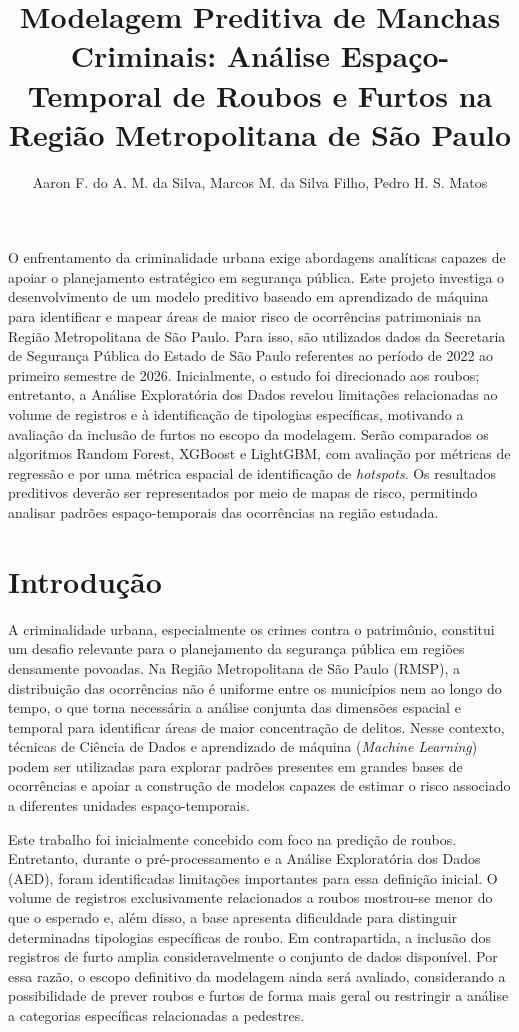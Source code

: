\documentclass[12pt]{article}
\title{Modelagem Preditiva de Manchas Criminais: Análise Espaço-Temporal de Roubos e Furtos na Região Metropolitana de São Paulo}
\author{Aaron F. do A. M. da Silva\inst{1}, Marcos M. da Silva Filho\inst{2}, Pedro H. S. Matos\inst{3}}
\begin{document}
\maketitle

\begin{resumo}
O enfrentamento da criminalidade urbana exige abordagens analíticas capazes de apoiar o planejamento estratégico em segurança pública. Este projeto investiga o desenvolvimento de um modelo preditivo baseado em aprendizado de máquina para identificar e mapear áreas de maior risco de ocorrências patrimoniais na Região Metropolitana de São Paulo. Para isso, são utilizados dados da Secretaria de Segurança Pública do Estado de São Paulo referentes ao período de 2022 ao primeiro semestre de 2026. Inicialmente, o estudo foi direcionado aos roubos; entretanto, a Análise Exploratória dos Dados revelou limitações relacionadas ao volume de registros e à identificação de tipologias específicas, motivando a avaliação da inclusão de furtos no escopo da modelagem. Serão comparados os algoritmos Random Forest, XGBoost e LightGBM, com avaliação por métricas de regressão e por uma métrica espacial de identificação de \textit{hotspots}. Os resultados preditivos deverão ser representados por meio de mapas de risco, permitindo analisar padrões espaço-temporais das ocorrências na região estudada.
\end{resumo}

\vspace{0.5cm}

\section{Introdução}

A criminalidade urbana, especialmente os crimes contra o patrimônio, constitui um desafio relevante para o planejamento da segurança pública em regiões densamente povoadas. Na Região Metropolitana de São Paulo (RMSP), a distribuição das ocorrências não é uniforme entre os municípios nem ao longo do tempo, o que torna necessária a análise conjunta das dimensões espacial e temporal para identificar áreas de maior concentração de delitos. Nesse contexto, técnicas de Ciência de Dados e aprendizado de máquina (\textit{Machine Learning}) podem ser utilizadas para explorar padrões presentes em grandes bases de ocorrências e apoiar a construção de modelos capazes de estimar o risco associado a diferentes unidades espaço-temporais.

Este trabalho foi inicialmente concebido com foco na predição de roubos. Entretanto, durante o pré-processamento e a Análise Exploratória dos Dados (AED), foram identificadas limitações importantes para essa definição inicial. O volume de registros exclusivamente relacionados a roubos mostrou-se menor do que o esperado e, além disso, a base apresenta dificuldade para distinguir determinadas tipologias específicas de roubo. Em contrapartida, a inclusão dos registros de furto amplia consideravelmente o conjunto de dados disponível. Por essa razão, o escopo definitivo da modelagem ainda será avaliado, considerando a possibilidade de prever roubos e furtos de forma mais geral ou restringir a análise a categorias específicas relacionadas a pedestres.
\end{document}
